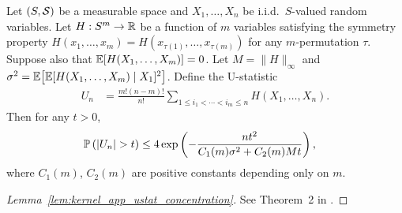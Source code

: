 \begin{lemma}
  \label{lem:kernel_app_ustat_concentration}

  Let $(S,\cS)$ be a measurable space and
  $X_1, \ldots, X_n$ be i.i.d.\ $S$-valued random variables.
  Let $H: S^m \to \R$ be a function of $m$ variables
  satisfying the symmetry property
  $H(x_1, \ldots, x_m) = H(x_{\tau (1)}, \ldots, x_{\tau (m)})$
  for any $m$-permutation $\tau$.
  Suppose also that
  $\E[H(X_1, \ldots, X_m)] = 0$.
  Let
  $M = \|H\|_\infty$
  and
  $\sigma^2 = \E\big[\E[H(X_1, \ldots, X_m) \mid X_1]^2\big]$.
  Define the U-statistic
  \begin{align*}
    U_n
    &=
    \frac{m!(n-m)!}{n!}
    \sum_{1 \leq i_1 < \cdots < i_m \leq n}
    H(X_1, \ldots, X_n).
  \end{align*}
  Then for any $t > 0$,
  \begin{align*}
    \P\left(
      |U_n| > t
    \right)
    &\leq
    4 \exp \left(
      - \frac{n t^2}{C_1(m) \sigma^2 + C_2(m) M t}
    \right),
  \end{align*}
  where $C_1(m)$, $C_2(m)$
  are positive constants depending only on $m$.

\end{lemma}

\begin{proof}[Lemma~\ref{lem:kernel_app_ustat_concentration}]

  See Theorem~2 in \citet{arcones1995bernstein}.
\end{proof}

